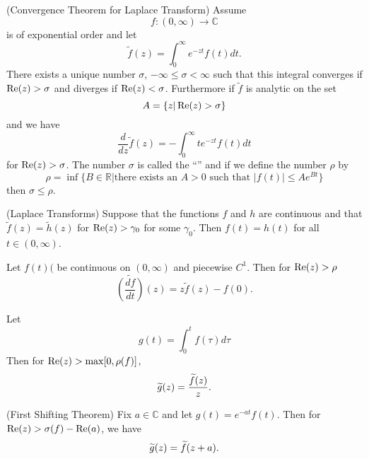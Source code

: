 \begin{thm}{(Convergence Theorem for Laplace Transform) }%
Assume
\begin{equation}%
f:(0,\infty)\to\mathbb{C}
\end{equation}
is of exponential order and let
\begin{equation}%
\widetilde{f}(z) = \int^{\infty}_{0}e^{-zt}f(t)dt.
\end{equation}
There exists a unique number $\sigma$, $-\infty\leq\sigma<\infty$
such that this integral converges if $\operatorname{Re}(z)>\sigma$ and diverges
if $\operatorname{Re}(z)<\sigma$. Furthermore if $\widetilde{f}$ is analytic on
the set
\begin{equation}%
A = \{z|\re(z)>\sigma\}
\end{equation}
and we have
\begin{equation}%
\frac{d}{dz}\widetilde{f}(z) = -\int^{\infty}_{0}te^{-zt}f(t)dt
\end{equation}
for $\operatorname{Re}(z)>\sigma$. The number $\sigma$ is called the
``'' and if we define the number
$\rho$ by 
\begin{equation}%
\rho=\inf\{B\in\mathbb{R}|\text{there exists an }A>0\text{ such
  that }|f(t)|\leq Ae^{Bt}\}
\end{equation}
then $\sigma\leq\rho$.
\end{thm}
\begin{thm}{(Laplace Transforms)}
Suppose that the functions $f$ and $h$ are continuous and that
$\widetilde{f}(z)=\widetilde{h}(z)$ for $\operatorname{Re}(z)>\gamma_0$ for
some $\gamma_0$. Then $f(t)=h(t)$ for all $t\in(0,\infty)$.
\end{thm}
\begin{prop}%
Let $f(t)($ be continuous on $(0,\infty)$ and piecewise
$C^1$. Then for $\operatorname{Re}(z)>\rho$
\begin{equation}%
\widetilde{\left(\frac{df}{dt}\right)}(z)=z\widetilde{f}(z)-f(0).
\end{equation}
\end{prop}
\begin{prop}%
Let
\begin{equation}%
g(t)=\int^{t}_{0}f(\tau)d\tau
\end{equation}
Then for $\operatorname{Re}(z)>\max[0,\rho(f)]$,
\begin{equation}%
\wt{g}(z) = \frac{\wt{f}(z)}{z}.
\end{equation}
\end{prop}
\begin{thm}{(First Shifting Theorem)}%
Fix $a\in\mathbb{C}$ and let $g(t)=e^{-at}f(t)$. Then for
$\operatorname{Re}(z)>\sigma(f)-\operatorname{Re}(a)$, we have
\begin{equation}%
\wt{g}(z)=\wt{f}(z+a).
\end{equation}
\end{thm}

